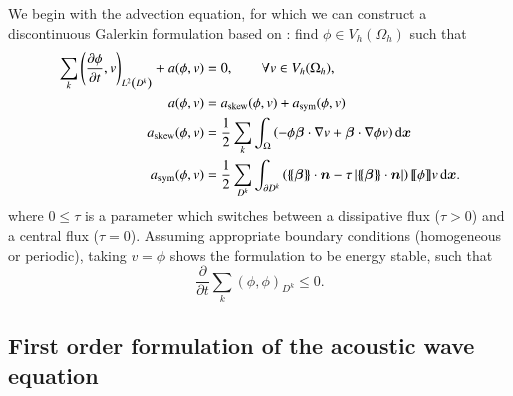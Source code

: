 \documentclass[preprint,10pt]{elsarticle}
\newcommand{\pd}[2]{\frac{\partial#1}{\partial#2}}
\newcommand{\LRp}[1]{\left( #1 \right)}
\newcommand{\LRb}[1]{\left| #1 \right|}
\newcommand{\LRc}[1]{\left\{ #1 \right\}}
\newcommand{\Grad} {\ensuremath{\nabla}}
\newcommand{\jump}[1] {\ensuremath{\llbracket#1\rrbracket}}
\newcommand{\avg}[1] {\ensuremath{\LRc{\!\{#1\}\!}}}
\newcommand{\reviewerOne}[1]{#1}
\newcommand{\reviewerTwo}[1]{#1}
\newcommand*\diff[1]{\mathop{}\!{\mathrm{d}#1}}
\begin{document}
We begin with the advection equation, for which we can construct a discontinuous Galerkin formulation based on \cite{kopriva2014energy}: \reviewerTwo{find $\phi \in V_h(\Omega_h)$ such that}
\begin{align}
\sum_k\LRp{\pd{\phi}{t},v}_{L^2\LRp{D^k}} + a(\phi,v) &= 0, \qquad \reviewerTwo{\forall v\in V_h(\Omega_h),}\label{eq:varformadvec}\\
a(\phi,v) &= a_{\rm skew}(\phi,v) + a_{\rm sym}(\phi,v) \nonumber\\
a_{\rm skew}(\phi,v) &= \frac{1}{2}\sum_k\int_{\Omega} \LRp{-\phi\bm{\beta}\cdot \Grad v + \bm{\beta}\cdot \Grad \phi v}\diff{{\bm{x}}}\nonumber\\
a_{\rm sym}(\phi,v) &= \frac{1}{2}\sum_{D^k}\int_{\partial D^k} \LRp{\avg{\bm{\beta}}\cdot\bm{n} - \tau\LRb{\avg{\bm{\beta}}\cdot\bm{n}}} \jump{\phi} v \diff{{\bm{x}}}.\nonumber  
\end{align}
where $0 \leq \tau$ is a parameter which switches between a dissipative flux ($\tau > 0$) and a central flux ($\tau = 0$).  Assuming appropriate boundary conditions (homogeneous or periodic), taking $v = \phi$ shows the formulation to be energy stable, such that
\[
\reviewerOne{\pd{}{t}\sum_{k}\LRp{\phi,\phi}_{D^k} \leq 0.}
\]

\subsection{First order formulation of the acoustic wave equation}
\end{document}
